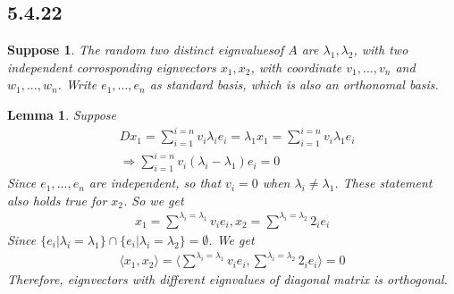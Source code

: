 \documentclass{article}
\newtheorem*{suppose}{Suppose}
\newtheorem*{lemma}{Lemma}
\begin{document}
\subsection*{5.4.22}
\begin{suppose}
    The random two distinct eignvaluesof $A$ are $\lambda_1, \lambda_2$, with two independent corrosponding eignvectors $x_1, x_2$, with 
    coordinate $v_1, ..., v_n$ and $w_1, ..., w_n$. Write $e_1, ..., e_n$ as standard basis, which is also an orthonomal basis.
\end{suppose}
\begin{lemma}
    Suppose
    \begin{equation*}
        \begin{split}
            & Dx_1 = \sum_{i = 1}^{i = n} v_i \lambda_i e_i = \lambda_1x_1 = \sum_{i = 1}^{i = n} v_i \lambda_1 e_i \\
            & \Rightarrow \sum_{i = 1}^{i = n} v_i (\lambda_i - \lambda_1) e_i = 0
        \end{split}
    \end{equation*}
    Since $e_1, ..., e_n$ are independent, so that $v_i = 0$ when $\lambda_i \ne \lambda_1$. These statement also holds true for $x_2$. So we get 
    \begin{equation*}
        \begin{split}
            x_1 = \stackrel{\lambda_i = \lambda_1}{\sum} v_ie_i, x_2 =  \stackrel{\lambda_i = \lambda_2}{\sum} 2_ie_i
        \end{split}
    \end{equation*}
    Since $\{e_i | \lambda_i = \lambda_1\} \cap \{e_i | \lambda_i = \lambda_2\} = \emptyset$.
    We get \begin{equation*}
        \begin{split}
            \langle x_1, x_2 \rangle = \langle \stackrel{\lambda_i = \lambda_1}{\sum} v_ie_i, \stackrel{\lambda_i = \lambda_2}{\sum} 2_ie_i\rangle = 0
        \end{split}
    \end{equation*}
    Therefore, eignvectors with different eignvalues of diagonal matrix is orthogonal.
\end{lemma}
\end{document}
